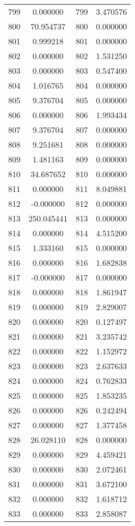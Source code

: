 \documentclass[12pt]{article}
\begin{document}
\begin{longtable}{@{}cccc@{}}
799 & 0.000000 & 799 & 3.470576 \\
800 & 70.954737 & 800 & 0.000000 \\
801 & 0.999218 & 801 & 0.000000 \\
802 & 0.000000 & 802 & 1.531250 \\
803 & 0.000000 & 803 & 0.547400 \\
804 & 1.016765 & 804 & 0.000000 \\
805 & 9.376704 & 805 & 0.000000 \\
806 & 0.000000 & 806 & 1.993434 \\
807 & 9.376704 & 807 & 0.000000 \\
808 & 9.251681 & 808 & 0.000000 \\
809 & 1.481163 & 809 & 0.000000 \\
810 & 34.687652 & 810 & 0.000000 \\
811 & 0.000000 & 811 & 8.049881 \\
812 & -0.000000 & 812 & 0.000000 \\
813 & 250.045441 & 813 & 0.000000 \\
814 & 0.000000 & 814 & 4.515200 \\
815 & 1.333160 & 815 & 0.000000 \\
816 & 0.000000 & 816 & 1.682838 \\
817 & -0.000000 & 817 & 0.000000 \\
818 & 0.000000 & 818 & 1.861947 \\
819 & 0.000000 & 819 & 2.829007 \\
820 & 0.000000 & 820 & 0.127497 \\
821 & 0.000000 & 821 & 3.235742 \\
822 & 0.000000 & 822 & 1.152972 \\
823 & 0.000000 & 823 & 2.637633 \\
824 & 0.000000 & 824 & 0.762833 \\
825 & 0.000000 & 825 & 1.853235 \\
826 & 0.000000 & 826 & 0.242494 \\
827 & 0.000000 & 827 & 1.377458 \\
828 & 26.028110 & 828 & 0.000000 \\
829 & 0.000000 & 829 & 4.459421 \\
830 & 0.000000 & 830 & 2.072461 \\
831 & 0.000000 & 831 & 3.672100 \\
832 & 0.000000 & 832 & 1.618712 \\
833 & 0.000000 & 833 & 2.858087 \\

\end{longtable}
\end{document}

